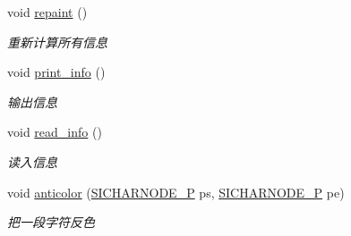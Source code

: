 \begin{DoxyCompactItemize}
\mbox{\label{class_s_i_t_e_x_t_a522c51f7d06db3e4797ee004666fa260}} 
void \hyperlink{class_s_i_t_e_x_t_a522c51f7d06db3e4797ee004666fa260}{repaint} ()
\begin{DoxyCompactList}\small\item\em 重新计算所有信息 \end{DoxyCompactList}\item 
\mbox{\label{class_s_i_t_e_x_t_a9555644951be5d9def8c2a8d4843bf4c}} 
void \hyperlink{class_s_i_t_e_x_t_a9555644951be5d9def8c2a8d4843bf4c}{print\+\_\+info} ()
\begin{DoxyCompactList}\small\item\em 输出信息 \end{DoxyCompactList}\item 
\mbox{\label{class_s_i_t_e_x_t_acb96e6f11f61d17d4361d895614bfd2d}} 
void \hyperlink{class_s_i_t_e_x_t_acb96e6f11f61d17d4361d895614bfd2d}{read\+\_\+info} ()
\begin{DoxyCompactList}\small\item\em 读入信息 \end{DoxyCompactList}\item 
\mbox{\label{class_s_i_t_e_x_t_af62ce4105e9450cc8c2319fed9fa7218}} 
void \hyperlink{class_s_i_t_e_x_t_af62ce4105e9450cc8c2319fed9fa7218}{anticolor} (\hyperlink{class_s_i_c_h_a_r_n_o_d_e}{S\+I\+C\+H\+A\+R\+N\+O\+D\+E\+\_\+P} ps, \hyperlink{class_s_i_c_h_a_r_n_o_d_e}{S\+I\+C\+H\+A\+R\+N\+O\+D\+E\+\_\+P} pe)
\begin{DoxyCompactList}\small\item\em 把一段字符反色 \end{DoxyCompactList}\end{DoxyCompactItemize}
